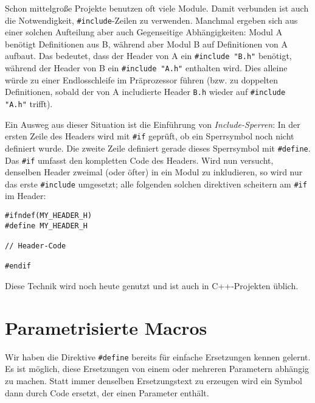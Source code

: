 \begin{hintbox}
Schon mittelgroße Projekte benutzen oft viele Module. Damit verbunden ist auch die Notwendigkeit, \texttt{#include}-Zeilen zu verwenden. Manchmal ergeben sich aus einer solchen Aufteilung aber auch Gegenseitige Abhängigkeiten: Modul A benötigt Definitionen aus B, während aber Modul B auf Definitionen von A aufbaut. Das bedeutet, dass der Header von A ein \texttt{#include "B.h"} benötigt, während der Header von B ein \texttt{#include "A.h"} enthalten wird. Dies alleine würde zu einer Endlosschleife im Präprozessor führen (bzw. zu doppelten Definitionen, sobald der von A includierte Header \texttt{B.h} wieder auf \texttt{#include "A.h"} trifft).

Ein Ausweg aus dieser Situation ist die Einführung von \emph{Include-Sperren}: In der ersten Zeile des Headers wird mit \texttt{#if} geprüft, ob ein Sperrsymbol noch nicht definiert wurde.
Die zweite Zeile definiert gerade dieses Sperrsymbol mit \texttt{#define}. Das 
\texttt{#if} umfasst den kompletten Code des Headers. Wird nun versucht, denselben Header zweimal (oder öfter) in ein Modul zu inkludieren, so wird nur das erste \texttt{#include} umgesetzt; alle folgenden solchen direktiven scheitern am \texttt{#if} im Header:

\begin{codebox}
\begin{verbatim}
#ifndef(MY_HEADER_H)
#define MY_HEADER_H

// Header-Code

#endif
\end{verbatim}
\end{codebox}

Diese Technik wird noch heute genutzt und ist auch in C++-Projekten üblich.
\end{hintbox}

\section{Parametrisierte Macros}
Wir haben die Direktive \texttt{#define} bereits für einfache Ersetzungen kennen gelernt. Es ist möglich, diese Ersetzungen von einem oder mehreren Parametern abhängig zu machen. Statt immer denselben Ersetzungstext zu erzeugen wird ein Symbol dann durch Code ersetzt, der einen Parameter enthält.

